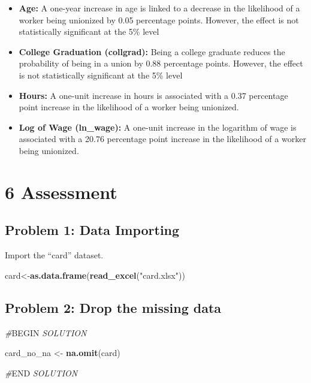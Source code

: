 \documentclass[
]{article}
\newenvironment{Shaded}{\begin{snugshade}}{\end{snugshade}}
\newcommand{\CommentTok}[1]{\textcolor[rgb]{0.56,0.35,0.01}{\textit{#1}}}
\newcommand{\FunctionTok}[1]{\textcolor[rgb]{0.13,0.29,0.53}{\textbf{#1}}}
\newcommand{\NormalTok}[1]{#1}
\newcommand{\OtherTok}[1]{\textcolor[rgb]{0.56,0.35,0.01}{#1}}
\newcommand{\RegionMarkerTok}[1]{#1}
\newcommand{\StringTok}[1]{\textcolor[rgb]{0.31,0.60,0.02}{#1}}
\begin{document}
\begin{itemize}
\item
  \textbf{Age:} A one-year increase in age is linked to a decrease in
  the likelihood of a worker being unionized by 0.05 percentage points.
  However, the effect is not statistically significant at the 5\% level
\item
  \textbf{College Graduation (collgrad):} Being a college graduate
  reduces the probability of being in a union by 0.88 percentage points.
  However, the effect is not statistically significant at the 5\% level
\item
  \textbf{Hours:} A one-unit increase in hours is associated with a 0.37
  percentage point increase in the likelihood of a worker being
  unionized.
\item
  \textbf{Log of Wage (ln\_wage):} A one-unit increase in the logarithm
  of wage is associated with a 20.76 percentage point increase in the
  likelihood of a worker being unionized.
\end{itemize}

\hypertarget{assessment}{%
\section{6 Assessment}\label{assessment}}

\hypertarget{problem-1-data-importing}{%
\subsection{Problem 1: Data Importing}\label{problem-1-data-importing}}

Import the ``card'' dataset.

\begin{Shaded}
\begin{Highlighting}[]
\NormalTok{card}\OtherTok{\textless{}{-}}\FunctionTok{as.data.frame}\NormalTok{(}\FunctionTok{read\_excel}\NormalTok{(}\StringTok{"card.xlsx"}\NormalTok{))}
\end{Highlighting}
\end{Shaded}

\hypertarget{problem-2-drop-the-missing-data}{%
\subsection{Problem 2: Drop the missing
data}\label{problem-2-drop-the-missing-data}}

\begin{Shaded}
\begin{Highlighting}[]
\CommentTok{\#}\RegionMarkerTok{BEGIN}\CommentTok{ SOLUTION}

\NormalTok{card\_no\_na }\OtherTok{\textless{}{-}} \FunctionTok{na.omit}\NormalTok{(card)}


\CommentTok{\#}\RegionMarkerTok{END}\CommentTok{ SOLUTION}
\end{Highlighting}
\end{Shaded}
\end{document}
